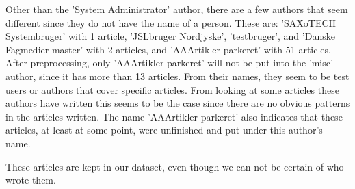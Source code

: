 Other than the 'System Administrator' author, there are a few authors that seem different since they do not have the name of a person.
These are: 'SAXoTECH Systembruger' with 1 article, 'JSLbruger Nordjyske', 'testbruger', and 'Danske Fagmedier master' with 2 articles, and 'AAArtikler parkeret' with 51 articles.
After preprocessing, only 'AAArtikler parkeret' will not be put into the 'misc' author, since it has more than 13 articles.
From their names, they seem to be test users or authors that cover specific articles.
From looking at some articles these authors have written this seems to be the case since there are no obvious patterns in the articles written.
The name 'AAArtikler parkeret' also indicates that these articles, at least at some point, were unfinished and put under this author's name.

These articles are kept in our dataset, even though we can not be certain of who wrote them.

